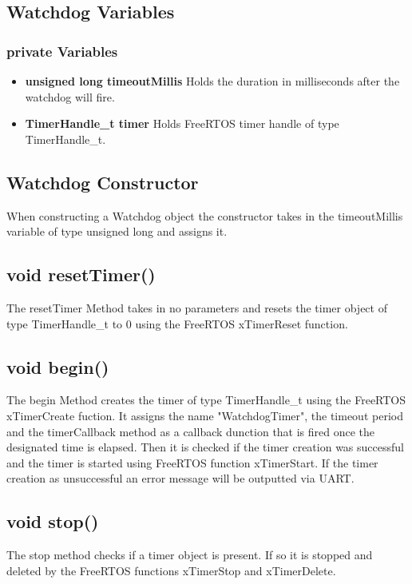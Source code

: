 \subsection{Watchdog Variables}
\label{subsec:Watchdog_Variables}

\subsubsection{private Variables}
\begin{itemize}
	\item \textbf{unsigned long timeoutMillis}
	\newline
	Holds the duration in milliseconds after the watchdog will fire. 
	\item \textbf{TimerHandle\_t timer}
	\newline
	Holds FreeRTOS timer handle of type TimerHandle\_t. 
\end{itemize}

\subsection{Watchdog Constructor}
\label{subsec:Watchdog_Constructor}
When constructing a Watchdog object the constructor takes in the timeoutMillis variable of type unsigned long and assigns it. 

\subsection{void resetTimer()}
\label{subsec:Watchdog_resetTimer}
The resetTimer Method takes in no parameters and resets the timer object of type TimerHandle\_t to 0 using the FreeRTOS xTimerReset function. 

\subsection{void begin()}
\label{subsec:Watchdog_begin}
The begin Method creates the timer of type TimerHandle\_t using the FreeRTOS xTimerCreate fuction. 
It assigns the name "WatchdogTimer", the timeout period and the timerCallback method as a callback dunction that is fired once the designated time is elapsed. 
Then it is checked if the timer creation was successful and the timer is started using FreeRTOS function xTimerStart. 
If the timer creation as unsuccessful an error message will be outputted via UART. 

\subsection{void stop()}
\label{subsec:Watchdog_stop}
The stop method checks if a timer object is present. 
If so it is stopped and deleted by the FreeRTOS functions xTimerStop and xTimerDelete. 

